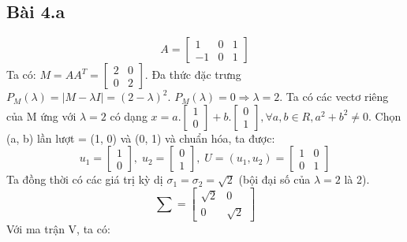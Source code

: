 \documentclass{article}
\begin{document}
\subsection*{Bài 4.a}
\[
    A = 
    \begin{bmatrix}
        1 & 0 & 1 \\ -1 & 0 & 1
    \end{bmatrix}
\]
Ta có: \( M = AA^T = \begin{bmatrix}
    2 & 0 \\
    0 & 2
\end{bmatrix}\). Đa thức đặc trưng \( P_M(\lambda) = |M - \lambda I| = (2-\lambda)^2.\)
\newline \( P_M(\lambda) = 0 \Rightarrow \lambda = 2.\)
\newline Ta có các vectơ riêng của M ứng với \( \lambda = 2\) có dạng
\( x = a.\begin{bmatrix} 1 \\ 0 \end{bmatrix} + b.\begin{bmatrix} 0 \\ 1 \end{bmatrix}
,\forall a, b \in R, a^2 + b^2 \neq 0. \) Chọn (a, b) lần lượt = (1, 0) và (0, 1) và chuẩn hóa, ta được: 
\[ 
    u_1 = \begin{bmatrix} 1 \\ 0 \end{bmatrix}, \;
    u_2 = \begin{bmatrix} 0 \\ 1 \end{bmatrix}, \;
    U = (u_1, u_2) = \begin{bmatrix}
        1 & 0 \\ 0 & 1
    \end{bmatrix}
\]
Ta đồng thời có các giá trị kỳ dị \( \sigma_1 = \sigma_2 = \sqrt2 \) (bội đại số của \( \lambda = 2 \) là 2). 
\[
    \sum = \begin{bmatrix}
        \sqrt2 & 0 \\ 0 & \sqrt2
    \end{bmatrix}    
\]
Với ma trận V, ta có:
\end{document}
